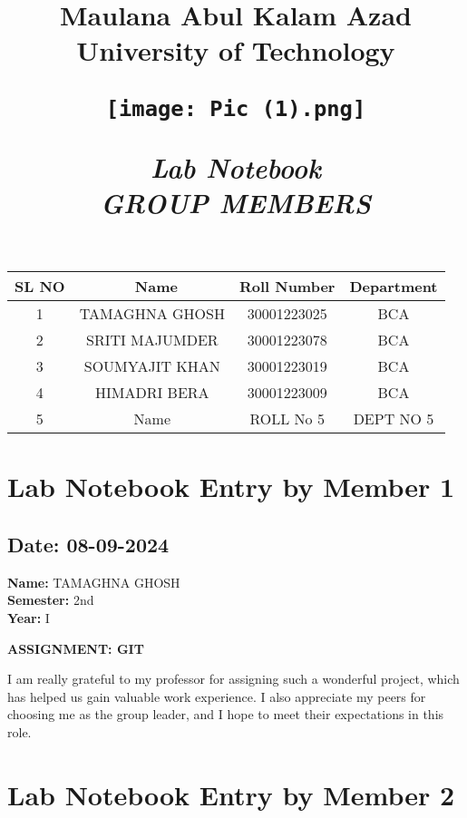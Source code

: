 \documentclass[12pt]{article}
\title{
    \vspace{0.2in}
    \Huge \textbf{Maulana Abul Kalam Azad University of Technology} \\
    \vspace{0.5in} %
    \begin{center}
        \texttt{[image: Pic (1).png]} %
    \end{center}
    \vspace{0.5in}
    \Huge\textbf{\textit{Lab Notebook}} \\
    \vspace{0.5in}
    \newpage
    \Large \textbf{\textit{GROUP MEMBERS}} \\
    \vspace{0.5in}
}
\date{}
\begin{document}
\maketitle

\begin{center}
    \begin{tabular}{|c| c | c | c |}
    \hline
    \textbf{SL NO}&\
    \textbf{Name} & \textbf{Roll Number} & \textbf{Department} \\
    \hline
     1 & TAMAGHNA GHOSH &30001223025 & BCA  \\
    \hline
     2& SRITI MAJUMDER & 30001223078 & BCA \\
    \hline
     3& SOUMYAJIT KHAN & 30001223019 & BCA   \\
    \hline
     4 & HIMADRI BERA & 30001223009 & BCA \\
    \hline
     5 & Name & ROLL No 5 & DEPT NO 5 \\
    \hline
    \end{tabular}
\end{center}

\newpage

\section{Lab Notebook Entry by Member 1}
\subsection*{Date: 08-09-2024}

\begin{flushright}
\textbf{Name:} TAMAGHNA GHOSH \\
\textbf{Semester:} 2nd \\
\textbf{Year:} I \\
\end{flushright}

\begin{center}
\Huge \textbf{ASSIGNMENT: GIT}
\end{center}

I am really grateful to my professor for assigning such a wonderful project, which has helped us gain valuable work experience. I also appreciate my peers for choosing me as the group leader, and I hope to meet their expectations in this role.

\newpage

\section{Lab Notebook Entry by Member 2}
\end{document}
